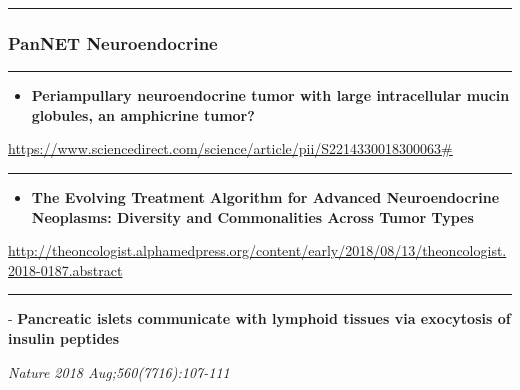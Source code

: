 \documentclass[]{article}
\providecommand{\tightlist}{%
  \setlength{\itemsep}{0pt}\setlength{\parskip}{0pt}}
\begin{document}
{}

{}

\begin{center}\rule{0.5\linewidth}{\linethickness}\end{center}

\hypertarget{pannet-neuroendocrine-3}{%
\subsubsection{PanNET Neuroendocrine}\label{pannet-neuroendocrine-3}}

\begin{center}\rule{0.5\linewidth}{\linethickness}\end{center}

\begin{itemize}
\tightlist
\item
  \textbf{Periampullary neuroendocrine tumor with large intracellular
  mucin globules, an amphicrine tumor?}
\end{itemize}

\url{https://www.sciencedirect.com/science/article/pii/S2214330018300063\#}

\begin{center}\rule{0.5\linewidth}{\linethickness}\end{center}

\begin{itemize}
\tightlist
\item
  \textbf{The Evolving Treatment Algorithm for Advanced Neuroendocrine
  Neoplasms: Diversity and Commonalities Across Tumor Types}
\end{itemize}

\url{http://theoncologist.alphamedpress.org/content/early/2018/08/13/theoncologist.2018-0187.abstract}

\begin{center}\rule{0.5\linewidth}{\linethickness}\end{center}

 - \textbf{Pancreatic islets communicate with lymphoid tissues via
exocytosis of insulin peptides}

\emph{Nature 2018 Aug;560(7716):107-111}
\end{document}

